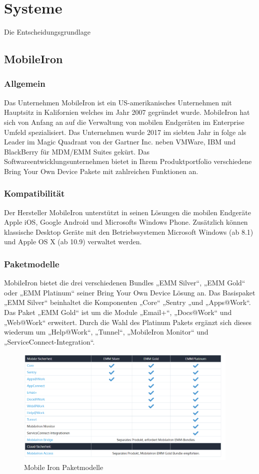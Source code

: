 \chapter{Systeme}
\label{cha:systeme}
Die Entscheidungsgrundlage 

\section{MobileIron}

\subsection {Allgemein} 
Das Unternehmen MobileIron ist ein US-amerikanisches Unternehmen mit Hauptsitz in Kalifornien welches im Jahr 2007 gegründet wurde. MobileIron hat sich von Anfang an auf die Verwaltung von mobilen Endgeräten im Enterprise Umfeld spezialisiert. Das Unternehmen wurde 2017 im siebten Jahr in folge als Leader im Magic Quadrant von der Gartner Inc. neben VMWare, IBM und BlackBerry für MDM/EMM Suites gekürt. Das Softwareentwicklungsunternehmen bietet in Ihrem Produktportfolio verschiedene Bring Your Own Device Pakete mit zahlreichen Funktionen an. 
\subsection {Kompatibilität}
Der Hersteller MobileIron unterstützt in seinen Lösungen die  mobilen Endgeräte Apple iOS, Google Android und Microsofts Windows Phone. Zusätzlich können klassische Desktop Geräte mit den Betriebssystemen Microsoft Windows (ab 8.1) und Apple OS X (ab 10.9)  verwaltet werden. 
\subsection {Paketmodelle}
MobileIron bietet die drei verschiedenen Bundles „EMM Silver“, „EMM Gold“ oder „EMM Platinum“ seiner Bring Your Own Device Lösung an.
Das Basispaket „EMM Silver“ beinhaltet die Komponenten „Core“ „Sentry „und „Apps@Work“. Das Paket „EMM Gold“ ist um die Module „Email+“, „Docs@Work“ und „Web@Work“ erweitert. Durch die Wahl des Platinum Pakets ergänzt sich dieses wiederum um „Help@Work“, „Tunnel“, „MobileIron Monitor“ und „ServiceConnect-Integration“.

\begin{figure}[hbt]
\centering
\includegraphics[width=0.95\textwidth]{Bilder/mi_1.png} 
\caption{Mobile Iron Paketmodelle}\label{fig:MobIro1}
\end{figure}

